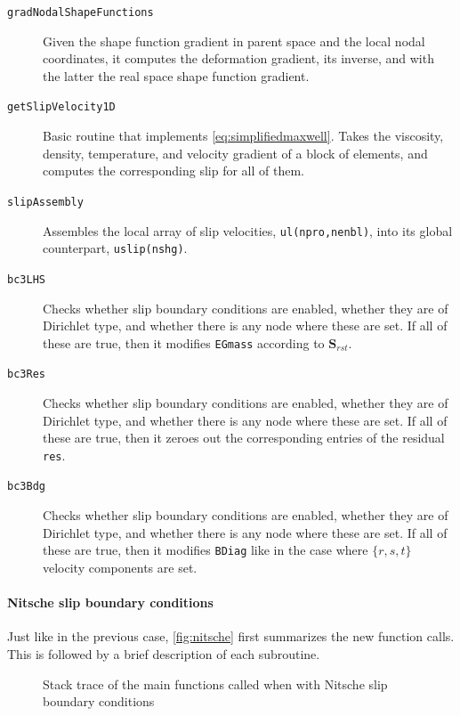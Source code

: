 \documentclass{ucb}
\begin{document}
\begin{description}
    \item[\texttt{gradNodalShapeFunctions}] Given the shape function gradient in parent space and the local nodal coordinates, it computes the deformation gradient, its inverse, and with the latter the real space shape function gradient.
    
    \item[\texttt{getSlipVelocity1D}] Basic routine that implements \autoref{eq:simplifiedmaxwell}. Takes the viscosity, density, temperature, and velocity gradient of a block of elements, and computes the corresponding slip for all of them.
    
    \item[\texttt{slipAssembly}] Assembles the local array of slip velocities, \texttt{ul(npro,nenbl)}, into its global counterpart, \texttt{uslip(nshg)}.
    
    \item[\texttt{bc3LHS}] Checks whether slip boundary conditions are enabled, whether they are of Dirichlet type, and whether there is any node where these are set. If all of these are true, then it modifies \texttt{EGmass} according to $\bm{S}_{rst}$.
    
    \item[\texttt{bc3Res}] Checks whether slip boundary conditions are enabled, whether they are of Dirichlet type, and whether there is any node where these are set. If all of these are true, then it zeroes out the corresponding entries of the residual \texttt{res}.
    
    \item[\texttt{bc3Bdg}] Checks whether slip boundary conditions are enabled, whether they are of Dirichlet type, and whether there is any node where these are set. If all of these are true, then it modifies \texttt{BDiag} like in the case where $\{r,s,t\}$ velocity components are set.

\end{description}

\pagebreak

\paragraph{Nitsche slip boundary conditions}

Just like in the previous case, \autoref{fig:nitsche} first summarizes the new function calls. This is followed by a brief description of each subroutine.

\begin{figure}[H]
    \caption{Stack trace of the main functions called when with Nitsche slip boundary conditions}
    \label{fig:nitsche}
\end{figure}
\end{document}
